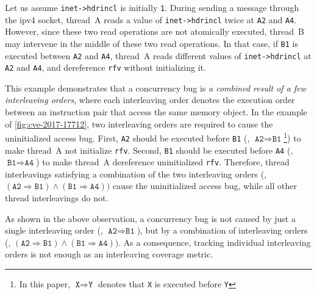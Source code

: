 Let us assume \texttt{inet->hdrincl} is initially \texttt{1}.
%
During sending a message through the ipv4 socket, thread~A reads a
value of \texttt{inet->hdrincl} twice at \texttt{A2} and \texttt{A4}.
%
However, since these two read operations are not atomically executed,
thread~B may intervene in the middle of these two read operations.
%
In that case, if \texttt{B1} is executed between \texttt{A2} and
\texttt{A4}, thread~A reads different values of \texttt{inet->hdrincl}
at \texttt{A2} and \texttt{A4}, and dereference \texttt{rfv} without
initializing it.


%
This example demonstrates that a concurrency bug is \textit{a combined
  result of a few interleaving orders}, where each interleaving order
denotes the execution order between an instruction pair that access
the same memory object.
%
In the example of \autoref{fig:cve-2017-17712}, two interleaving orders
are required to cause the uninitialized access bug.
%
First, \texttt{A2} should be executed before \texttt{B1} (\ie,
$\texttt{A2} \Rightarrow \texttt{B1}$\footnote{In this paper,
  $\texttt{X} \Rightarrow \texttt{Y}$ denotes that \texttt{X} is
  executed before \texttt{Y}}) to make thread~A not initialize
\texttt{rfv}.
%
Second, \texttt{B1} should be executed before \texttt{A4} (\ie,
$\texttt{B1} \Rightarrow \texttt{A4}$) to make thread~A dereference
uninitialized \texttt{rfv}.
%
Therefore, thread interleavings satisfying a combination of the two
interleaving orders (\ie,
$(\texttt{A2} \Rightarrow \texttt{B1}) \wedge (\texttt{B1} \Rightarrow
\texttt{A4}))$ cause the uninitialized access bug, while all other
thread interleavings do not.


%
As shown in the above observation, a concurrency bug is not caused by
just a single interleaving order (\eg,
$\texttt{A2} \Rightarrow \texttt{B1}$), but by a combination of
interleaving orders (\eg,
$(\texttt{A2} \Rightarrow \texttt{B1}) \wedge (\texttt{B1} \Rightarrow
\texttt{A4}))$.
%
As a consequence, tracking individual interleaving
orders is not enough as an interleaving coverage metric.

